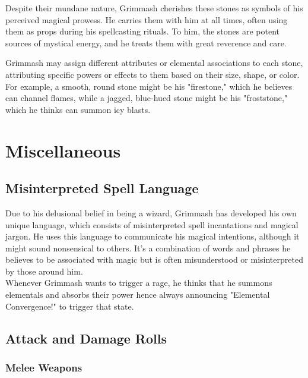 \documentclass[letterpaper,openany,oneside,twocolumn]{book}
\begin{document}
Despite their mundane nature, Grimmash cherishes these stones as symbols of his perceived magical prowess. He carries them with him at all times, often using them as props during his spellcasting rituals. To him, the stones are potent sources of mystical energy, and he treats them with great reverence and care.

Grimmash may assign different attributes or elemental associations to each stone, attributing specific powers or effects to them based on their size, shape, or color. For example, a smooth, round stone might be his "firestone," which he believes can channel flames, while a jagged, blue-hued stone might be his "froststone," which he thinks can summon icy blasts.

\section*{Miscellaneous}
\subsection*{Misinterpreted Spell Language}
Due to his delusional belief in being a wizard, Grimmash has developed his own unique language, which consists of misinterpreted spell incantations and magical jargon. He uses this language to communicate his magical intentions, although it might sound nonsensical to others. It's a combination of words and phrases he believes to be associated with magic but is often misunderstood or misinterpreted by those around him.\\
Whenever Grimmash wants to trigger a rage, he thinks that he summons elementals and absorbs their power hence always announcing "Elemental Convergence!" to trigger that state.

\subsection*{Attack and Damage Rolls}
\subsubsection*{Melee Weapons}
\end{document}
